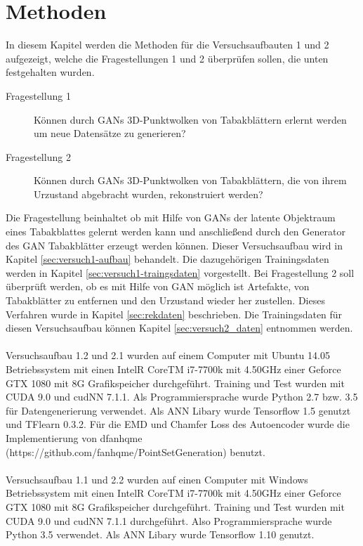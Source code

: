 \documentclass{llncs}
\begin{document}
\section{Methoden}
In diesem Kapitel werden die Methoden für die Versuchsaufbauten 1 und 2 aufgezeigt, welche die Fragestellungen 1 und 2 überprüfen sollen, die unten festgehalten wurden.
\begin{description}
	\item[Fragestellung 1]
	Können durch GANs 3D-Punktwolken von Tabakblättern erlernt werden um neue Datensätze zu generieren?\\
	
	\item[Fragestellung 2] Können durch GANs 3D-Punktwolken von Tabakblättern, die von ihrem Urzustand abgebracht wurden, rekonstruiert werden? 
\end{description}
Die Fragestellung beinhaltet ob mit Hilfe von GANs der latente Objektraum eines Tabakblattes gelernt werden kann und anschließend durch den Generator des GAN Tabakblätter erzeugt werden können. Dieser Versuchsaufbau wird in Kapitel \ref{sec:versuch1-aufbau} behandelt. Die dazugehörigen Trainingsdaten werden in Kapitel \ref{sec:versuch1-traingsdaten} vorgestellt. Bei Fragestellung 2 soll überprüft werden, ob es mit Hilfe von GAN möglich ist Artefakte, von Tabakblätter zu entfernen und den Urzustand wieder her zustellen.  Dieses Verfahren wurde in Kapitel \ref{sec:rekdaten} beschrieben. Die Trainingsdaten für diesen Versuchsaufbau können Kapitel \ref{sec:versuch2_daten} entnommen werden. 
\\\\
Versuchsaufbau 1.2 und 2.1 wurden auf einem Computer mit Ubuntu 14.05 Betriebssystem mit einen IntelR CoreTM i7-7700k mit 4.50GHz einer Geforce GTX 1080 mit 8G Grafikspeicher durchgeführt. Training und Test  wurden mit CUDA 9.0 und cudNN 7.1.1. Als Programmiersprache wurde Python 2.7 bzw. 3.5 für Datengenerierung verwendet. Als ANN Libary wurde Tensorflow 1.5 genutzt und TFlearn 0.3.2. Für die EMD und Chamfer Loss des Autoencoder wurde die Implementierung von dfanhqme (https://github.com/fanhqme/PointSetGeneration) benutzt.
\\\\
Versuchsaufbau 1.1 und 2.2  wurden auf einen Computer mit Windows Betriebssystem mit einen IntelR CoreTM i7-7700k mit 4.50GHz einer Geforce GTX 1080 mit 8G Grafikspeicher durchgeführt. Training und Test wurden mit CUDA 9.0 und cudNN 7.1.1 durchgeführt. Also Programmiersprache wurde Python 3.5 verwendet. Als ANN Libary wurde Tensorflow 1.10 genutzt.
\newpage
\end{document}
